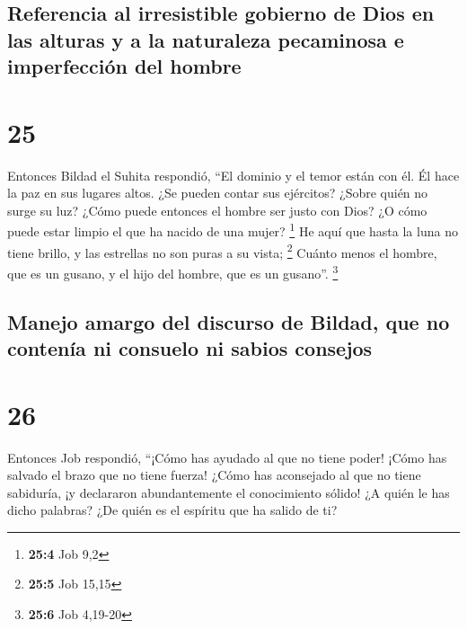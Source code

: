 \hypertarget{referencia-al-irresistible-gobierno-de-dios-en-las-alturas-y-a-la-naturaleza-pecaminosa-e-imperfecciuxf3n-del-hombre}{%
\subsection{Referencia al irresistible gobierno de Dios en las alturas y
a la naturaleza pecaminosa e imperfección del
hombre}\label{referencia-al-irresistible-gobierno-de-dios-en-las-alturas-y-a-la-naturaleza-pecaminosa-e-imperfecciuxf3n-del-hombre}}

\hypertarget{section-24}{%
\section{25}\label{section-24}}

 Entonces Bildad el Suhita respondió,  ``El
dominio y el temor están con él. Él hace la paz en sus lugares altos.
 ¿Se pueden contar sus ejércitos? ¿Sobre quién no surge su
luz?  ¿Cómo puede entonces el hombre ser justo con Dios?
¿O cómo puede estar limpio el que ha nacido de una mujer? \footnote{\textbf{25:4}
  Job 9,2}  He aquí que hasta la luna no tiene brillo, y
las estrellas no son puras a su vista; \footnote{\textbf{25:5} Job 15,15}
 Cuánto menos el hombre, que es un gusano, y el hijo del
hombre, que es un gusano''. \footnote{\textbf{25:6} Job 4,19-20}

\hypertarget{manejo-amargo-del-discurso-de-bildad-que-no-contenuxeda-ni-consuelo-ni-sabios-consejos}{%
\subsection{Manejo amargo del discurso de Bildad, que no contenía ni
consuelo ni sabios
consejos}\label{manejo-amargo-del-discurso-de-bildad-que-no-contenuxeda-ni-consuelo-ni-sabios-consejos}}

\hypertarget{section-25}{%
\section{26}\label{section-25}}

 Entonces Job respondió,  ``¡Cómo has
ayudado al que no tiene poder! ¡Cómo has salvado el brazo que no tiene
fuerza!  ¿Cómo has aconsejado al que no tiene sabiduría,
¡y declararon abundantemente el conocimiento sólido!  ¿A
quién le has dicho palabras? ¿De quién es el espíritu que ha salido de
ti?

